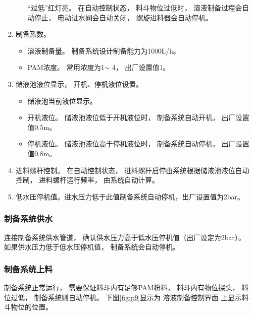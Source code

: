 \begin{enumerate}
\begin{itemize}
                    “过低”红灯亮。
                    在自动控制状态，
                    料斗物位过低时，
                    溶液制备过程会自动停止，
                    电动进水阀会自动关闭，
                    螺旋进料器会自动停机。
            \end{itemize}
         \item 制备系数。
            \begin{itemize}
               \item 溶液制备量。
               制备系统设计制备能力为1000L/h。
               \item PAM浓度。
               常用浓度为1\textperthousand $\sim$ 4\textperthousand，
               出厂设置值1\textperthousand。
            \end{itemize}
         \item 储液池液位显示，
            开机、停机液位设置。
            \begin{itemize}
               \item 储液池当前液位显示。
               \item 开机液位。
                  储液池液位低于开机液位时，
                  制备系统自动开机，
                  出厂设置值0.5m。
               \item 停机液位。
                  储液池液位高于停机液位时，
                  制备系统自动停机，
                  出厂设置值0.8m。
            \end{itemize}
         \item 进料螺杆控制。
            在自动控制状态，
            进料螺杆启停由系统根据储液池液位自动控制，
            进料螺杆运行频率，
            由系统自动计算。
         \item 低水压停机值。进水压力低于此值制备系统自动停机，出厂设置值为2bar。
      \end{enumerate}

      \subsubsection{制备系统供水}\label{sec:sg4}
         连接制备系统供水管道，
         确认供水压力高于低水压停机值（出厂设定为2bar）。
         如果供水压力低于低水压停机值，
         制备系统会自动停机。

      \subsubsection{制备系统上料}
         制备系统正常运行，
         需要保证料斗内有足够PAM粉料，
         料斗内有物位探头，
         料位过低，
         制备系统则自动停机。
         下图\ref{fig:p9}显示为
         溶液制备控制界面
         上显示料斗物位的位置。

